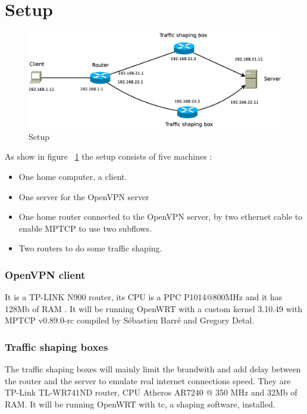  \section{Setup}


  \begin{figure}[h!]
    \centering
    \includegraphics[width=12cm]{./images/setup.eps}
    \caption{Setup}
    \label{setup_fig}
  \end{figure}

  As show in figure ~\ref{setup_fig} the setup consists of five machines :

  \begin{itemize}
    \item One home computer, a client.
    \item One server for the OpenVPN server
    \item One home router connected to the OpenVPN server, by two ethernet cable to enable MPTCP to use two subflows.
    \item Two routers to do some traffic shaping.
  \end{itemize}

  \subsubsection{OpenVPN client}

  It is a TP-LINK N900 router, its CPU is a PPC P1014@800MHz and it has 128Mb of RAM \autocite{openwrt_n900}.
  It will be running OpenWRT with a custom kernel 3.10.49 with MPTCP v0.89.0-rc compiled by Sébastien Barré and Gregory Detal.

  \subsubsection{Traffic shaping boxes}
  The traffic shaping boxes will mainly limit the brandwith and add delay between the router and the server to emulate real internet connections speed.
  They are TP-Link TL-WR741ND router, CPU Atheros AR7240 @ 350 MHz and 32Mb of RAM. It will be running OpenWRT with tc, a shaping software, installed.

